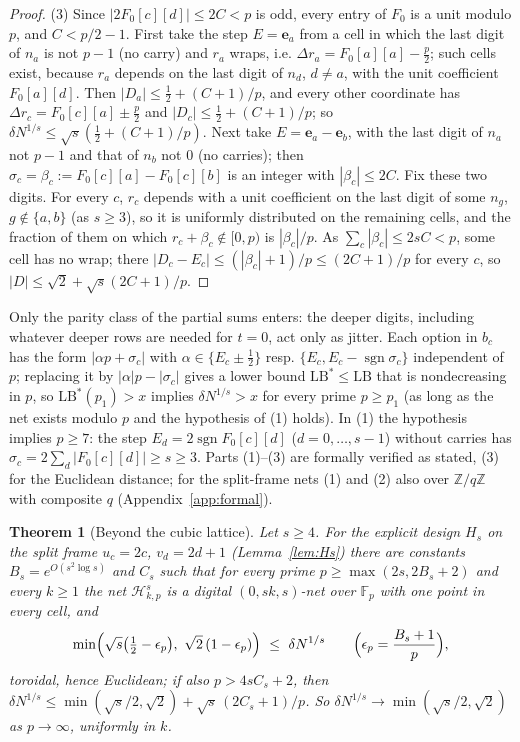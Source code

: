 \documentclass[11pt]{amsart}
\newtheorem{theorem}{Theorem}
\theoremstyle{definition}
\theoremstyle{plain}
\newcommand{\Z}{\mathbb{Z}}
\newcommand{\F}{\mathbb{F}}
\newcommand{\e}{\mathbf{e}}
\DeclareMathOperator{\sgn}{sgn}
\begin{document}
\begin{proof}
(3) Since $|2F_0[c][d]|\le2C<p$ is odd, every entry of $F_0$ is a unit modulo $p$, and $C<p/2-1$. First take the step $E=\e_a$ from a cell in which the last digit of $n_a$ is not $p-1$ (no carry) and $r_a$ wraps, i.e. $\Delta r_a=F_0[a][a]-\frac p2$; such cells exist, because $r_a$ depends on the last digit of $n_d$, $d\ne a$, with the unit coefficient $F_0[a][d]$. Then $|D_a|\le\frac12+(C+1)/p$, and every other coordinate has $\Delta r_c=F_0[c][a]\pm\frac p2$ and $|D_c|\le\frac12+(C+1)/p$; so $\delta N^{1/s}\le\sqrt s(\frac12+(C+1)/p)$. Next take $E=\e_a-\e_b$, with the last digit of $n_a$ not $p-1$ and that of $n_b$ not $0$ (no carries); then $\sigma_c=\beta_c:=F_0[c][a]-F_0[c][b]$ is an integer with $|\beta_c|\le2C$. Fix these two digits. For every $c$, $r_c$ depends with a unit coefficient on the last digit of some $n_g$, $g\notin\{a,b\}$ (as $s\ge3$), so it is uniformly distributed on the remaining cells, and the fraction of them on which $r_c+\beta_c\notin[0,p)$ is $|\beta_c|/p$. As $\sum_c|\beta_c|\le2sC<p$, some cell has no wrap; there $|D_c-E_c|\le(|\beta_c|+1)/p\le(2C+1)/p$ for every $c$, so $|D|\le\sqrt2+\sqrt s(2C+1)/p$.
\end{proof}

Only the parity class of the partial sums enters: the deeper digits, including whatever deeper rows are needed for $t=0$, act only as jitter. Each option in $b_c$ has the form $|\alpha p+\sigma_c|$ with $\alpha\in\{E_c\pm\frac12\}$ resp. $\{E_c,E_c-\sgn\sigma_c\}$ independent of $p$; replacing it by $|\alpha|p-|\sigma_c|$ gives a lower bound $\mathrm{LB}^*\le\mathrm{LB}$ that is nondecreasing in $p$, so $\mathrm{LB}^*(p_1)>x$ implies $\delta N^{1/s}>x$ for every prime $p\ge p_1$ (as long as the net exists modulo $p$ and the hypothesis of (1) holds). In (1) the hypothesis implies $p\ge7$: the step $E_d=2\sgn F_0[c][d]$ ($d=0,\dots,s-1$) without carries has $\sigma_c=2\sum_d|F_0[c][d]|\ge s\ge3$.
Parts (1)--(3) are formally verified as stated, (3) for the Euclidean distance; for the split-frame nets (1) and (2) also over $\Z/q\Z$ with composite $q$ (Appendix~\ref{app:formal}).

\begin{theorem}[Beyond the cubic lattice]\label{thm:HL}
Let $s\ge4$. For the explicit design $H_s$ on the split frame $u_c=2c$, $v_d=2d+1$ (Lemma~\ref{lem:Hs}) there are constants $B_s=e^{O(s^2\log s)}$ and $C_s$ such that for every prime $p\ge\max(2s,2B_s+2)$ and every $k\ge1$ the net $\mathcal H^s_{k,p}$ is a digital $(0,sk,s)$-net over $\F_p$ with one point in every cell, and
\[
\min\Bigl(\sqrt s\bigl(\tfrac12-\epsilon_p\bigr),\ \sqrt2\,(1-\epsilon_p)\Bigr)\ \le\ \delta N^{1/s}\qquad\Bigl(\epsilon_p=\frac{B_s+1}p\Bigr),
\]
toroidal, hence Euclidean; if also $p>4sC_s+2$, then $\delta N^{1/s}\le\min(\sqrt s/2,\sqrt2)+\sqrt s\,(2C_s+1)/p$. So $\delta N^{1/s}\to\min(\sqrt s/2,\sqrt2)$ as $p\to\infty$, uniformly in $k$.
\end{theorem}
\end{document}
